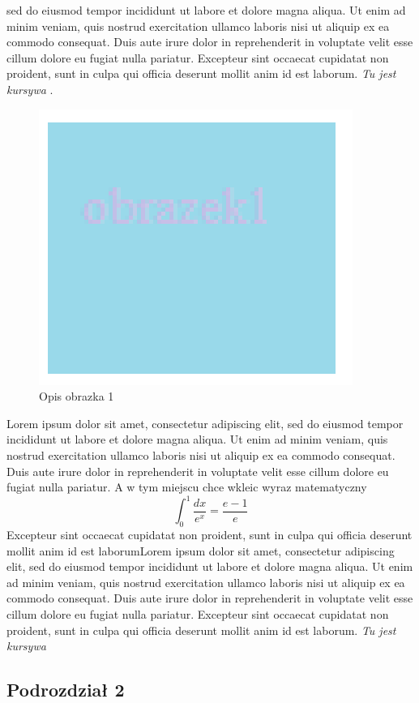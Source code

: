 \documentclass[12pt,a4paper,titlepage]{article}
\begin{document}
sed do eiusmod tempor incididunt ut labore et dolore magna aliqua.  Ut enim ad minim veniam, quis nostrud exercitation ullamco laboris nisi ut aliquip ex ea commodo consequat. Duis aute irure dolor in reprehenderit in voluptate velit esse cillum dolore eu fugiat nulla pariatur. Excepteur sint occaecat cupidatat non proident, sunt in culpa qui officia deserunt mollit anim id est laborum.  \textit{Tu jest kursywa} .
\begin{figure}
\includegraphics[scale=0.5]{obrazek1.png}
\caption{Opis obrazka 1}
\label{fig:obr1}
\end{figure}
Lorem ipsum dolor sit amet, consectetur adipiscing elit, sed do eiusmod tempor incididunt ut labore et dolore magna aliqua. Ut enim ad minim veniam, quis nostrud exercitation ullamco laboris nisi ut aliquip ex ea commodo consequat. Duis aute irure dolor in reprehenderit in voluptate velit esse cillum dolore eu fugiat nulla pariatur. 
A w tym miejscu chce wkleic wyraz matematyczny
\[ \int_0^1 \frac{dx}{e^x} =  \frac{e-1}{e} \]
Excepteur sint occaecat cupidatat non proident, sunt in culpa qui officia deserunt mollit anim id est laborumLorem ipsum dolor sit amet, consectetur adipiscing elit, sed do eiusmod tempor incididunt ut labore et dolore magna aliqua.  Ut enim ad minim veniam, quis nostrud exercitation ullamco laboris nisi ut aliquip ex ea commodo consequat. Duis aute irure dolor in reprehenderit in voluptate velit esse cillum dolore eu fugiat nulla pariatur. Excepteur sint occaecat cupidatat non proident, sunt in culpa qui officia deserunt mollit anim id est laborum.  \textit{Tu jest kursywa} 

\subsection{Podrozdział 2}
\end{document}
